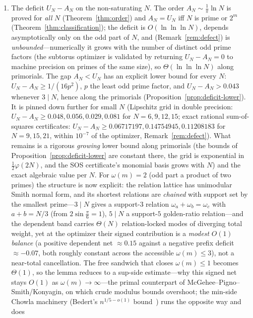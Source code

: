 \documentclass[11pt,reqno]{amsart}
\theoremstyle{plain}
\theoremstyle{definition}
\begin{document}
\begin{enumerate}
\item The deficit $U_N-A_N$ on the non-saturating $N$. The order $A_N\sim\tfrac1\pi\ln N$ is proved for
\emph{all} $N$ (Theorem~\ref{thm:order}) and $A_N=U_N$ iff $N$ is prime or $2^m$
(Theorem~\ref{thm:classification}); the deficit is $O(\ln\ln\ln N)$, depends asymptotically only on the odd
part of $N$, and (Remark~\ref{rem:defect}) is \emph{unbounded}---numerically it grows with the number of
distinct odd prime factors (the subtorus optimizer is validated by returning $U_N-A_N=0$ to machine
precision on primes of the same size), so $\Theta(\ln\ln\ln N)$ along primorials. The gap $A_N<U_N$ has an
explicit lower bound for every $N$: $U_N-A_N\ge1/(16p^2)$, $p$ the least odd prime factor, and $U_N-A_N>0.043$
whenever $3\mid N$, hence along the primorials (Proposition~\ref{prop:deficit-lower}). It is pinned down further
for small $N$ (Lipschitz grid in double precision: $U_N-A_N\ge0.048,0.056,0.029,0.081$ for
$N=6,9,12,15$; exact rational sum-of-squares certificates: $U_N-A_N\ge0.06717197,0.14754945,0.11208183$ for
$N=9,15,21$, within $10^{-7}$ of the optimizer, Remark~\ref{rem:defect}). What remains is a rigorous
\emph{growing} lower bound along primorials (the bounds of Proposition~\ref{prop:deficit-lower} are constant
there, the grid is exponential in $\tfrac12\varphi(2N)$, and the SOS certificate's monomial basis grows with $N$)
and the exact algebraic value per $N$. For $\omega(m)=2$ (odd part a product of two primes)
the structure is now explicit: the relation lattice has unimodular Smith normal form, and its shortest
relations are \emph{chained} with support set by the smallest prime---$3\mid N$ gives a support-$3$ relation
$\omega_a+\omega_b=\omega_c$ with $a+b=N/3$ (from $2\sin\tfrac\pi6=1$), $5\mid N$ a support-$5$
golden-ratio relation---and the dependent band carries $\Theta(N)$ relation-locked modes of diverging total
weight, yet at the optimizer their signed contribution is a \emph{modest $O(1)$ balance} (a positive
dependent net $\approx0.15$ against a negative prefix deficit $\approx-0.07$, both roughly constant across the
accessible $\omega(m)\le3$), not a near-total cancellation. The free sandwich that closes $\omega(m)\le1$
becomes $\Theta(1)$, so the lemma reduces to a sup-side estimate---why this signed net stays $O(1)$ as
$\omega(m)\to\infty$---the primal counterpart of McGehee--Pigno--Smith/Konyagin, on which crude modulus bounds
overshoot; the min-side Chowla machinery (Bedert's $n^{1/5-o(1)}$ bound~\cite{Bedert25}) runs the opposite way and does

\end{enumerate}
\end{document}
